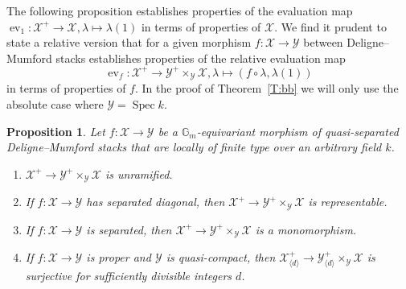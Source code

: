 \documentclass[a4paper]{amsart}
\theoremstyle{plain}
\newtheorem{proposition}[theorem]{Proposition}
\theoremstyle{definition}
\theoremstyle{remark}
\numberwithin{equation}{section}
\newcommand{\GG}{\mathbb{G}}
\newcommand\cX{\mathcal{X}}
\newcommand\cY{\mathcal{Y}}
\newcommand\co{\colon}
\DeclareMathOperator{\Spec}{Spec}
\DeclareMathOperator{\ev}{ev}
\begin{document}
The following proposition establishes properties of the evaluation map $\ev_1 \co \cX^+ \to \cX, \lambda \mapsto \lambda(1)$ in terms of properties of $\cX$.  We  find it prudent to state a relative version that for a given morphism $f \co \cX \to \cY$ between Deligne--Mumford stacks
establishes properties of the relative evaluation map
$$\ev_f \co \cX^+ \to \cY^+ \times_{\cY} \cX, \lambda \mapsto (f \circ \lambda, \lambda(1))$$
in terms of properties of $f$. In the proof of Theorem~\ref{T:bb} we will only use the absolute case where $\cY=\Spec k$.

\begin{proposition} \label{P:ev1}
Let $f \co \cX \to \cY$ be a $\GG_m$-equivariant morphism of quasi-separated Deligne--Mumford stacks that are
locally of finite type over an arbitrary field $k$.
\begin{enumerate}
	\item \label{P:ev1-unramified}
	$\cX^+ \to \cY^+ \times_{\cY} \cX$ is unramified.		
	\item \label{P:ev1-representable}
	If $f \co \cX \to \cY$ has separated diagonal, then $\cX^+ \to \cY^+ \times_{\cY} \cX$ is representable.
	\item \label{P:ev1-monomorphism}
	 If $f \co \cX \to \cY$ is separated, then $\cX^+ \to \cY^+ \times_{\cY} \cX$ is a monomorphism.
	\item \label{P:ev1-surjective}
	If $f \co \cX \to \cY$ is proper and $\cY$ is quasi-compact, then $\cX_{\langle d \rangle}^+ \to  \cY_{\langle d \rangle}^+ \times_{\cY} \cX$ is surjective for sufficiently divisible integers $d$.
\end{enumerate}
 \end{proposition}
 
\end{document}
